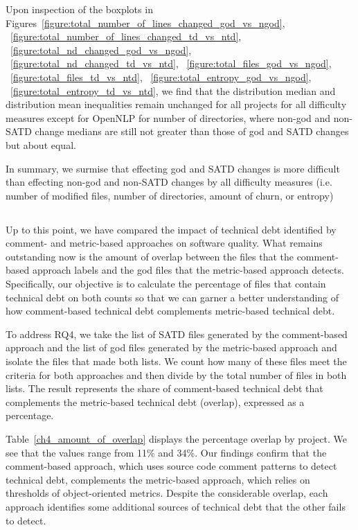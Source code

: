 Upon inspection of the boxplots in Figures~\ref{figure:total_number_of_lines_changed_god_vs_ngod},
~\ref{figure:total_number_of_lines_changed_td_vs_ntd},
~\ref{figure:total_nd_changed_god_vs_ngod},
~\ref{figure:total_nd_changed_td_vs_ntd},
~\ref{figure:total_files_god_vs_ngod},
~\ref{figure:total_files_td_vs_ntd},
~\ref{figure:total_entropy_god_vs_ngod},
~\ref{figure:total_entropy_td_vs_ntd}, we find that the distribution median and distribution mean inequalities remain unchanged for all projects for all difficulty measures except for OpenNLP for number of directories, where non-god and non-SATD change medians are still not greater than those of god and SATD changes but about equal.

In summary, we surmise that effecting god and SATD changes is more difficult than effecting non-god and non-SATD changes by all difficulty measures (i.e. number of modified files, number of directories, amount of churn, or entropy)




\subsection*{\chapterIVrqIV}



Up to this point, we have compared the impact of technical debt identified by comment- and metric-based approaches on software quality. What remains outstanding now is the amount of overlap between the \SATD files that the comment-based approach labels and the god files that the metric-based approach detects. Specifically, our objective is to calculate the percentage of files that contain technical debt on both counts so that we can garner a better understanding of how comment-based technical debt complements metric-based technical debt.


To address RQ4, we take the list of SATD files generated by the comment-based approach and the list of god files generated by the metric-based approach and isolate the files that made both lists. We count how many of these files meet the criteria for both approaches and then divide by the total number of files in both lists. The result represents the share of comment-based technical debt that complements the metric-based technical debt (overlap), expressed as a percentage.


Table~\ref{ch4_amount_of_overlap} displays the percentage overlap by project. We see that the values range from 11\% and 34\%. Our findings confirm that the comment-based approach, which uses source code comment patterns to detect technical debt, complements the metric-based approach, which relies on thresholds of object-oriented metrics. Despite the considerable overlap, each approach identifies some additional sources of technical debt that the other fails to detect.

